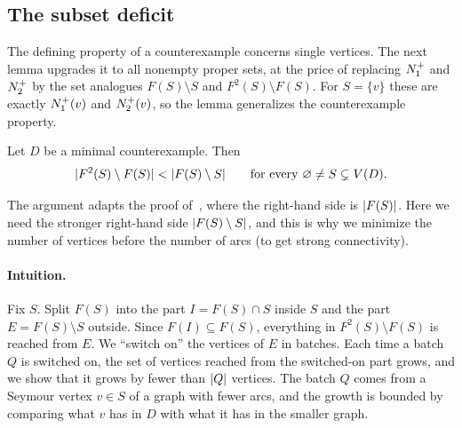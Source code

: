 \subsection{The subset deficit}\label{sec:subset-deficit}

The defining property of a counterexample concerns single vertices. The
next lemma upgrades it to all nonempty proper sets, at the price of
replacing $N^+_1$ and $N^+_2$ by the set analogues $F(S)\setminus S$ and
$F^2(S)\setminus F(S)$. For $S=\{v\}$ these are exactly $N^+_1(v)$ and
$N^+_2(v)$, so the lemma generalizes the counterexample property.

\begin{lemma}\label{lem:subset-deficit}
Let $D$ be a minimal counterexample. Then
\begin{equation}\label{eq:subset-deficit}
 \lvert F^2(S)\setminus F(S)\rvert<\lvert F(S)\setminus S\rvert
 \qquad\text{for every }\varnothing\ne S\subsetneq V(D).
\end{equation}
\end{lemma}

The argument adapts the proof of~\cite[Lemma~4]{Seacrest2019}, where the
right-hand side is $\lvert F(S)\rvert$. Here we need the stronger right-hand side
$\lvert F(S)\setminus S\rvert$, and this is why we minimize the number of vertices
before the number of arcs (to get strong connectivity).

\paragraph{Intuition.}
Fix $S$. Split $F(S)$ into the part $I=F(S)\cap S$ inside $S$ and the part
$E=F(S)\setminus S$ outside. Since $F(I)\subseteq F(S)$, everything in
$F^2(S)\setminus F(S)$ is reached from $E$. We ``switch on'' the vertices
of $E$ in batches. Each time a batch $Q$ is switched on, the set of vertices
reached from the switched-on part grows, and we show that it grows by
fewer than $\lvert Q\rvert$ vertices. The batch $Q$ comes from a Seymour vertex
$v\in S$ of a graph with fewer arcs, and the growth is bounded by comparing
what $v$ has in $D$ with what it has in the smaller graph.

